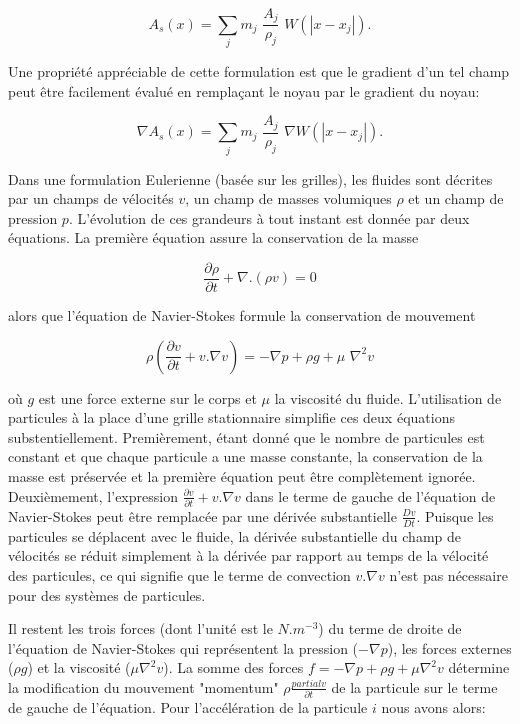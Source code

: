 \documentclass[11pt]{report}
\begin{document}
\begin{equation}
A_s(x) = \sum_j m_j\,\, \frac{A_j}{\rho_j}\,\, W(|x - x_j|).
\end{equation}

Une propriété appréciable de cette formulation est que le gradient d'un tel champ peut être facilement évalué en remplaçant le noyau par le gradient du noyau:

\begin{equation}\label{equation/sph-99}
\nabla A_s(x) = \sum_j m_j\,\, \frac{A_j}{\rho_j}\,\,\nabla W(|x - x_j|).
\end{equation}

Dans une formulation Eulerienne (basée sur les grilles), les fluides sont décrites par un champs de vélocités $v$, un champ de masses volumiques $\rho$ et un champ de pression $p$. L'évolution de ces grandeurs à tout instant est donnée par deux équations. La première équation assure la conservation de la masse

\begin{equation}
\frac{\partial \rho}{\partial t} + \nabla . (\rho v) = 0
\end{equation}

alors que l'équation de Navier-Stokes formule la conservation de mouvement

\begin{equation}
\rho \left( \frac{\partial v}{\partial t} + v . \nabla v  \right) = - \nabla p + \rho g + \mu\,\, \nabla^2 v
\end{equation}

où $g$ est une force externe sur le corps et $\mu$ la viscosité du fluide. L'utilisation de particules à la place d'une grille stationnaire simplifie ces deux équations substentiellement. Premièrement, étant donné que le nombre de particules est constant et que chaque particule a une masse constante, la conservation de la masse est préservée et la première équation  peut être complètement ignorée. Deuxièmement, l'expression  $\frac{\partial v}{\partial t} + v . \nabla v $ dans le terme de gauche de l'équation de Navier-Stokes peut être remplacée par une dérivée substantielle $\frac{Dv}{Dt}$. Puisque les particules se déplacent avec le fluide, la dérivée substantielle du champ de vélocités se réduit simplement à la dérivée par rapport au temps de la vélocité des particules, ce qui signifie que le terme de convection $v.\nabla v$ n'est pas nécessaire pour des systèmes de particules.


Il restent les trois forces (dont l'unité est le $N.m^{-3}$) du terme de droite de l'équation de Navier-Stokes qui représentent la pression ($-\nabla p$), les forces externes ($\rho g$) et la viscosité ($\mu \nabla^2 v$). La somme des forces $f = -\nabla p + \rho g + \mu \nabla^2 v$ détermine  la modification du mouvement "momentum" $\rho \frac{partial v}{\partial t}$ de la particule sur le terme de gauche de l'équation. Pour l'accélération de la particule $i$ nous avons alors:
\end{document}
